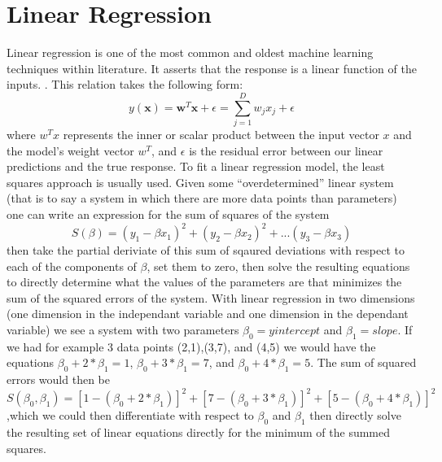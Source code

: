 \section{Linear Regression}
Linear regression is one of the most common and oldest machine learning techniques within
literature. It asserts that the response is a linear function of the inputs. \cite{murphy}.
This relation takes the following form:
$$ y(\textbf{x}) = \textbf{w}^T\textbf{x} + \epsilon = \sum_{j=1}^{D}w_jx_j + \epsilon $$
where $w^Tx$ represents the inner or scalar product between the input vector $x$ and the
model's weight vector $w^T$, and $\epsilon$ is the residual error between our linear predictions
and the true response.
To fit a linear regression model, the least squares approach is usually used. Given some
 ``overdetermined'' linear system (that is to say a system in which there are more data points
 than parameters) one can write an expression for the sum of squares of the system $$S(\beta) =
 (y_1 - \beta x_1)^2 + (y_2 - \beta x_2)^2 + ... (y_3 - \beta x_3)$$ then take the partial deriviate
 of this sum of sqaured deviations with respect to each of the components of $\beta$, set them to
 zero, then solve the resulting equations to directly determine what the values of the parameters
 are that minimizes the sum of the squared errors of the system. With linear regression in two dimensions
 (one dimension in the independant variable and one dimension in the dependant variable) we see a system
 with two parameters $\beta_0 = y intercept$ and $\beta_1 = slope$. If we had for example 3 data points
 (2,1),(3,7), and (4,5) we would have the equations $\beta_0 + 2*\beta_1 = 1$, $\beta_0 + 3*\beta_1 = 7$,
 and $\beta_0 + 4*\beta_1 = 5$. The sum of squared errors would then be
 $S(\beta_0,\beta_1)= [1 - (\beta_0 + 2*\beta_1)]^2 + [7 - (\beta_0 + 3*\beta_1)]^2 + [5 - (\beta_0 + 4*\beta_1)]^2$
 ,which we could then differentiate with respect to $\beta_0$ and $\beta_1$ then directly solve the resulting set
 of linear equations directly for the minimum of the summed squares.
